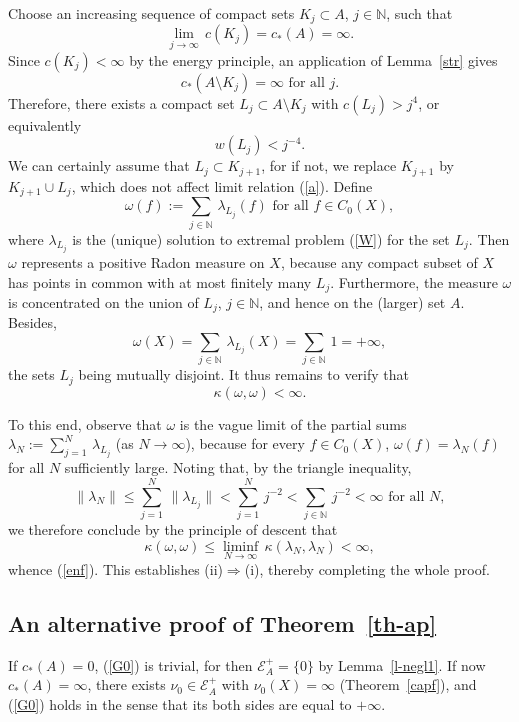 \documentclass[12pt,a4paper,reqno]{amsart} %
\theoremstyle{lause}
\theoremstyle{maaritelma}
\theoremstyle{lause}
\theoremstyle{maaritelma}
\numberwithin{equation}{section}
\begin{document}
Choose an increasing sequence of compact sets $K_j\subset A$, $j\in\mathbb N$, such that
\begin{equation}\label{a}\lim_{j\to\infty}\,c(K_j)=c_*(A)=\infty.\end{equation}
Since $c(K_j)<\infty$ by the energy principle, an application of Lemma~\ref{str} gives
\[c_*(A\setminus K_j)=\infty\text{ \ for all $j$}.\]
Therefore, there exists a compact set $L_j\subset A\setminus K_j$ with $c(L_j)>j^4$, or equivalently
\[w(L_j)<j^{-4}.\]
We can certainly assume that $L_j\subset K_{j+1}$, for if not, we replace $K_{j+1}$ by $K_{j+1}\cup L_j$, which does not affect limit relation (\ref{a}). Define
\[\omega(f):=\sum_{j\in\mathbb N}\,\lambda_{L_j}(f)\text{ \ for all $f\in C_0(X)$},\]
where $\lambda_{L_j}$ is the (unique) solution to extremal problem (\ref{W}) for the set $L_j$. Then $\omega$ represents a positive Radon measure on $X$, because any compact subset of $X$ has points in common with at most finitely many $L_j$. Furthermore, the measure $\omega$ is concentrated on the union of $L_j$, $j\in\mathbb N$, and hence on the (larger) set $A$. Besides,
\[\omega(X)=\sum_{j\in\mathbb N}\,\lambda_{L_j}(X)=\sum_{j\in\mathbb N}\,1=+\infty,\]
the sets $L_j$ being mutually disjoint. It thus remains to verify that
\begin{equation}\label{enf}
 \kappa(\omega,\omega)<\infty.
\end{equation}

To this end, observe that $\omega$ is the vague limit of the partial sums
$\lambda_N:=\sum_{j=1}^N\,\lambda_{L_j}$
(as $N\to\infty$), because for every $f\in C_0(X)$, $\omega(f)=\lambda_N(f)$ for all $N$ sufficiently large. Noting that, by the triangle inequality,
\[\|\lambda_N\|\leqslant\sum_{j=1}^N\,\|\lambda_{L_j}\|<\sum_{j=1}^N\,j^{-2}<\sum_{j\in\mathbb N}\,j^{-2}<\infty\text{ \ for all $N$},\]
we therefore conclude by the principle of descent that
\[\kappa(\omega,\omega)\leqslant\liminf_{N\to\infty}\,\kappa(\lambda_N,\lambda_N)<\infty,\]
whence (\ref{enf}). This establishes (ii)$\Rightarrow$(i), thereby completing the whole proof.

\subsection{An alternative proof of Theorem~\ref{th-ap}}\label{p} If $c_*(A)=0$, (\ref{G0}) is trivial, for then $\mathcal E^+_A=\{0\}$ by Lemma~\ref{l-negl1}. If now $c_*(A)=\infty$, there exists $\nu_0\in\mathcal E^+_A$ with $\nu_0(X)=\infty$ (Theorem~\ref{capf}), and (\ref{G0}) holds in the sense that its both sides are equal to $+\infty$.
\end{document}
